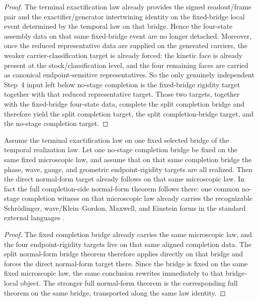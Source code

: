 \begin{proof}
The terminal exactification law already provides the signed readout/frame pair
and the exactifier/generator intertwining identity on the fixed-bridge local
event determined by the temporal law on that bridge. Hence the four-state
assembly data on that same fixed-bridge event are no longer detached. Moreover,
once the reduced representative data are supplied on the generated carriers,
the weaker carrier-classification target is already forced: the kinetic face is
already present at the stock/classification level, and the four remaining faces
are carried as canonical endpoint-sensitive representatives. So the only
genuinely independent Step~4 input left below no-stage completion is the
fixed-bridge rigidity target together with that reduced representative target.
Those two targets, together with the fixed-bridge four-state data, complete the
split completion bridge and therefore yield the split completion target, the
split completion-bridge target, and the no-stage completion target.
\end{proof}

\begin{theorem}
\label{thm:law-native-completion-bridge-plus-lane-rigidity-yields-the-direct-flagship-normal-forms}
Assume the terminal exactification law on one fixed selected bridge of the
temporal realization law. Let one no-stage completion bridge be fixed on the
same fixed microscopic law, and assume that on that same completion
bridge the phase, wave, gauge, and geometric endpoint-rigidity targets are all
realized. Then the direct normal-form target already follows on that
same microscopic law. In fact the full completion-side normal-form theorem follows
there: one common no-stage completion witness on that microscopic law already
carries the recognizable Schr\"odinger, wave/Klein--Gordon, Maxwell, and
Einstein forms in the standard external languages
\cite{Schrodinger1926,Klein1926,Maxwell1865,Einstein1915,Wald1984}.
\end{theorem}

\begin{proof}
The fixed completion bridge already carries the same microscopic law, and the
four endpoint-rigidity targets live on that same aligned completion data. The
split normal-form bridge theorem therefore applies directly on that bridge and
forces the direct normal-form target there. Since the bridge is fixed on the
same fixed microscopic law, the same conclusion rewrites immediately to
that bridge-local object. The stronger full normal-form theorem is the
corresponding full theorem on the same bridge, transported along the
same law identity.
\end{proof}

